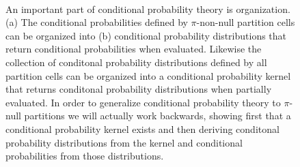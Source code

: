 \documentclass[
  letterpaper,
  DIV=11,
  numbers=noendperiod]{scrartcl}
\begin{document}
\begin{figure}
\begin{minipage}{0.33\linewidth}
\subcaption{\label{fig-conditional-organization-distributions}}

\end{minipage}%
%
\begin{minipage}{0.33\linewidth}


\subcaption{\label{fig-conditional-organization-kernel}}

\end{minipage}%
%
\begin{minipage}{0.01\linewidth}
~\end{minipage}%

\caption{\label{fig-conditional-organization}An important part of
conditional probability theory is organization. (a) The conditional
probabilities defined by \(\pi\)-non-null partition cells can be
organized into (b) conditional probability distributions that return
conditional probabilities when evaluated. Likewise the collection of
conditonal probability distributions defined by all partition cells can
be organized into a conditional probability kernel that returns
conditonal probability distributions when partially evaluated. In order
to generalize conditional probability theory to \(\pi\)-null partitions
we will actually work backwards, showing first that a conditional
probability kernel exists and then deriving conditonal probability
distributions from the kernel and conditional probabilities from those
distributions.}

\end{figure}%
\end{document}
